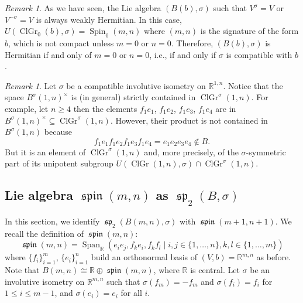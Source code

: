 \documentclass[a4paper,oneside,11pt]{amsart}
\DeclareMathOperator{\Span}{Span}
\DeclareMathOperator{\spin}{\mathfrak{spin}}
\DeclareMathOperator{\spp}{\mathfrak{sp}}
\DeclareMathOperator{\ClGr}{ClGr}
\DeclareMathOperator{\Spin}{Spin}
\newcommand{\R}{\mathbb R}
\theoremstyle{plain}
\theoremstyle{definition}
\theoremstyle{remark}
\newtheorem{rem}[teo]{Remark}
\begin{document}
\begin{rem}
    As we have seen, the Lie algebra $(B(b),\sigma)$ such that $V^\sigma=V$ or $V^{-\sigma}=V$ is always weakly Hermitian. In this case, $U(\ClGr_0(b),\sigma)=\Spin_0(m,n)$ where $(m,n)$ is the signature of the form $b$, which is not compact unless $m=0$ or $n=0$. Therefore, $(B(b),\sigma)$ is Hermitian if and only of $m=0$ or $n=0$, i.e., if and only if $\sigma$ is compatible with $b$.
\end{rem}

\begin{rem}
    Let $\sigma$ be a compatible involutive isometry on $\R^{1,n}$. Notice that the space $B^\sigma(1,n)^\times$ is (in general) strictly contained in $\ClGr^\sigma(1,n)$. For example, let $n\geq 4$ then the elements $f_1e_1$, $f_1e_2$, $f_1e_3$, $f_1e_4$ are in $B^\sigma(1,n)^\times\subseteq \ClGr^\sigma(1,n)$. However, their product is not contained in  $B^\sigma(1,n)$ because 
    $$f_1e_1f_1e_2f_1e_3f_1e_4=e_1e_2e_3e_4\notin B.$$
    But it is an element of $\ClGr^\sigma(1,n)$ and, more precisely, of the $\sigma$-symmetric part of its unipotent subgroup $U(\ClGr(1,n),\sigma)\cap \ClGr^\sigma(1,n)$.
\end{rem}

\subsection{Lie algebra \texorpdfstring{$\spin(m,n)$}{spin(m,n)} as \texorpdfstring{$\spp_2(B,\sigma)$}{sp2(B,sigma)}}


In this section, we identify $\spp_2(B(m,n),\sigma)$ with $\spin(m+1,n+1)$. We recall the definition of $\spin(m,n)$:
$$\spin(m,n)=\Span_\R(e_ie_j, f_ke_i, f_kf_l\mid i,j\in\{1,\dots,n\}, k,l\in\{1,\dots,m\})$$
where $\{f_i\}_{i=1}^{m}$, $\{e_i\}_{i=1}^n$ build an orthonormal basis of $(V,b)=\R^{m,n}$ as before. Note that $B(m,n)\cong\mathbb R\oplus\spin(m,n)$, where $\R$ is central. Let $\sigma$ be an involutive isometry on $\R^{m,n}$ such that $\sigma(f_m)=-f_m$ and $\sigma(f_i)=f_i$ for $1\leq i\leq m-1$, and $\sigma(e_i)=e_i$ for all $i$.
\end{document}
